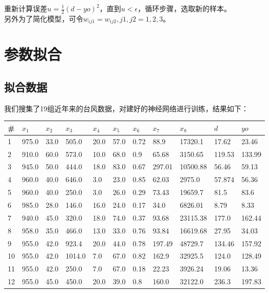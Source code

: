 \documentclass[12pt]{article}
\begin{document}
\indent 重新计算误差$u = \frac{1}{2}(d - yo)^2$，直到$u < \epsilon$，循环步骤，选取新的样本。\\
\indent 另外为了简化模型，可令$w_{ij1} = w_{ij2}, j1, j2 = 1, 2, 3$。

\clearpage

\section{参数拟合}

\subsection{拟合数据}

我们搜集了19组近年来的台风数据，对建好的神经网络进行训练，结果如下：

\begin{table}[h]
\begin{tabular}{|l|l|l|l|l|l|l|l|l|l|l|}
\hline
{\bf \#} & $x_1$ & $x_2$ & $x_3$ & $x_4$ & $x_5$ & $x_6$ & $x_7$ & $x_8$ & $d$ & $yo$ \\ \hline 
1 & 975.0 & 33.0 & 505.0 & 20.0 & 57.0 & 0.72 & 88.9 & 17320.1 & 17.62 & 23.46 \\ \hline
2 & 910.0 & 60.0 & 573.0 & 10.0 & 68.0 & 0.9 & 65.68 & 3150.65 & 119.53 & 133.99 \\ \hline
3 & 945.0 & 50.0 & 444.0 & 18.0 & 83.0 & 0.67 & 297.01 & 10500.88 & 56.46 & 59.13 \\ \hline
4 & 960.0 & 40.0 & 646.0 & 3.0 & 23.0 & 0.85 & 62.03 & 2975.0 & 57.874 & 56.36 \\ \hline
5 & 960.0 & 40.0 & 250.0 & 3.0 & 26.0 & 0.29 & 73.43 & 19659.7 & 81.5 & 83.6 \\ \hline
6 & 985.0 & 28.0 & 146.0 & 16.0 & 24.0 & 0.17 & 34.0 & 6826.01 & 8.79 & 8.33 \\ \hline
7 & 940.0 & 45.0 & 320.0 & 18.0 & 74.0 & 0.37 & 93.68 & 23115.38 & 177.0 & 162.44 \\ \hline
8 & 958.0 & 35.0 & 466.0 & 13.0 & 33.0 & 0.76 & 93.84 & 16619.68 & 27.95 & 34.03 \\ \hline
9 & 955.0 & 42.0 & 923.4 & 20.0 & 44.0 & 0.78 & 197.49 & 48729.7 & 134.46 & 157.92 \\ \hline
10 & 955.0 & 42.0 & 1014.0 & 7.0 & 67.0 & 0.82 & 162.9 & 32925.5 & 124.0 & 128.49 \\ \hline
11 & 955.0 & 42.0 & 250.0 & 7.0 & 67.0 & 0.18 & 22.23 & 3926.24 & 19.06 & 13.36 \\ \hline
12 & 955.0 & 45.0 & 450.0 & 20.0 & 39.0 & 0.8 & 160.0 & 32122.0 & 236.3 & 197.83 \\ \hline

\end{tabular}
\end{table}
\end{document}
